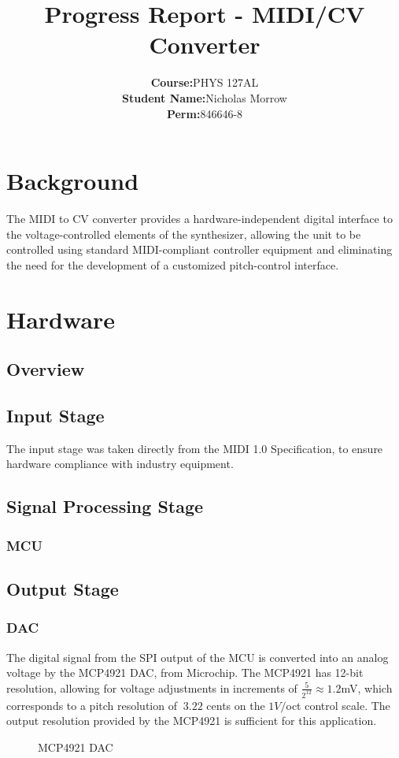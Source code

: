 \documentclass[10pt,a4paper]{article}
\author{\begin{tabular}{rl}
\textbf{Course:} & PHYS 127AL \\
\textbf{Student Name:} & Nicholas Morrow \\
\textbf{Perm:} & 846646-8 \\
\end{tabular}}
\title{Progress Report - MIDI/CV Converter}
\begin{document}
	\begin{titlepage}
		\maketitle
		\tableofcontents
	\end{titlepage}

	\section{Background}
		The MIDI to CV converter provides a hardware-independent digital interface to the voltage-controlled elements of the synthesizer, allowing the unit to be controlled using standard MIDI-compliant controller equipment and eliminating the need for the development of a customized pitch-control interface.
	\section{Hardware}
		\subsection{Overview}
		\subsection{Input Stage}
				The input stage was taken directly from the MIDI 1.0 Specification, to ensure hardware compliance with industry equipment.
		\subsection{Signal Processing Stage}
			\subsubsection{MCU}
		\subsection{Output Stage}
			\subsubsection{DAC}
				The digital signal from the SPI output of the MCU is converted into an analog voltage by the MCP4921 DAC, from Microchip. The MCP4921 has 12-bit resolution, allowing for voltage adjustments in increments of $\frac{5}{2^{12}} \approx1.2$mV, which corresponds to a pitch resolution of $~3.22$ cents on the $1V/$oct control scale. The output resolution provided by the MCP4921 is sufficient for this application. 
				\begin{figure}[H]
					\caption{MCP4921 DAC}
					\label{fig:dac}
				\end{figure}
\end{document}

